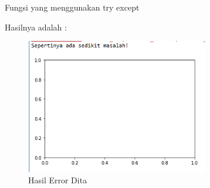 \begin{enumerate}
Fungsi yang menggunakan try except

Hasilnya adalah : 
\begin{figure}[H]
	\includegraphics[width=8cm]{figures/6/1174054/Praktek/error.png}
	\centering
	\caption{Hasil Error Dita}
\end{figure}

\end{enumerate}


